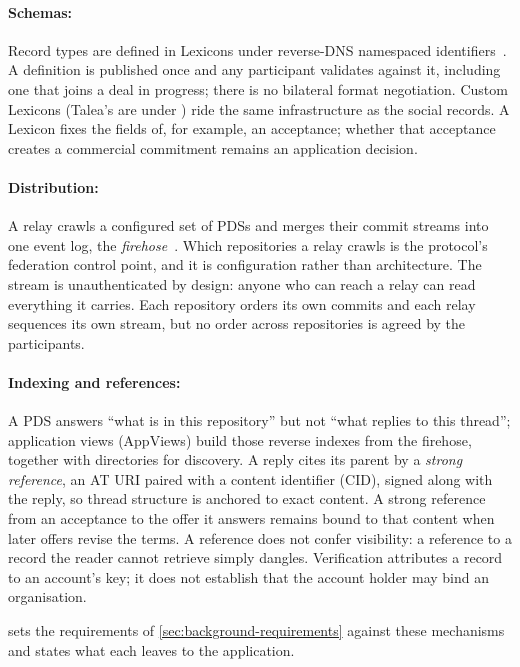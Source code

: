 \paragraph{Schemas:} Record types are defined in Lexicons under reverse-DNS namespaced identifiers~\citep{atplexicon}. A definition is published once and any participant validates against it, including one that joins a deal in progress; there is no bilateral format negotiation. Custom Lexicons (Talea's are under ) ride the same infrastructure as the social records. A Lexicon fixes the fields of, for example, an acceptance; whether that acceptance creates a commercial commitment remains an application decision.

\paragraph{Distribution:} A relay crawls a configured set of PDSs and merges their commit streams into one event log, the \emph{firehose}~\citep{atpsync}. Which repositories a relay crawls is the protocol's federation control point, and it is configuration rather than architecture. The stream is unauthenticated by design: anyone who can reach a relay can read everything it carries. Each repository orders its own commits and each relay sequences its own stream, but no order across repositories is agreed by the participants.

\paragraph{Indexing and references:} A PDS answers ``what is in this repository'' but not ``what replies to this thread''; application views (AppViews) build those reverse indexes from the firehose, together with directories for discovery. A reply cites its parent by a \emph{strong reference}, an AT URI paired with a content identifier (CID), signed along with the reply, so thread structure is anchored to exact content. A strong reference from an acceptance to the offer it answers remains bound to that content when later offers revise the terms. A reference does not confer visibility: a reference to a record the reader cannot retrieve simply dangles. Verification attributes a record to an account's key; it does not establish that the account holder may bind an organisation.

 sets the requirements of \cref{sec:background-requirements} against these mechanisms and states what each leaves to the application.

